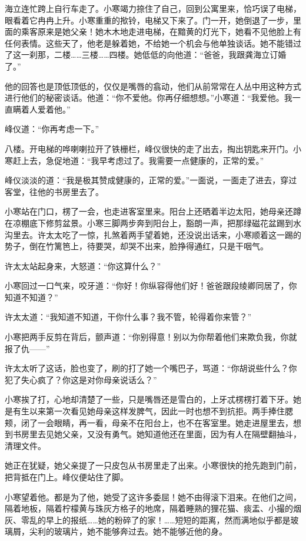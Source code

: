 \par 海立连忙跨上自行车走了。小寒竭力捺住了自己，回到公寓里来，恰巧误了电梯，眼看着它冉冉上升。小寒重重的揿铃，电梯又下来了。门一开，她倒退了一步，里面的乘客原来是她父亲！她木木地走进电梯，在黯黄的灯光下，她看不见他脸上有任何表情。这些天了，他老是躲着她，不给她一个机会与他单独谈话。她不能错过了这一刹那，二楼……三楼……四楼。她低低的向他道：“爸爸，我跟龚海立订婚了。”
\par 他的回答也是顶低顶低的，仅仅是嘴唇的翕动，他们从前常常在人丛中用这种方式进行他们的秘密谈话。他道：“你不爱他。你再仔细想想。”小寒道：“我爱他。我一直瞒着人爱着他。”
\par 峰仪道：“你再考虑一下。”
\par 八楼。开电梯的哗喇喇拉开了铁栅栏，峰仪很快的走了出去，掏出钥匙来开门。小寒赶上去，急促地道：“我早考虑过了。我需要一点健康的，正常的爱。”
\par 峰仪淡淡的道：“我是极其赞成健康的，正常的爱。”一面说，一面走了进去，穿过客堂，往他的书房里去了。
\par 小寒站在门口，楞了一会，也走进客室里来。阳台上还晒着半边太阳，她母亲还蹲在凉棚底下修剪盆景。小寒三脚两步奔到阳台上，豁朗一声，把那绿磁花盆踢到水沟里去。许太太吃了一惊，扎煞着两手望着她，还没说出话来，小寒顺着这一踢的势子，倒在竹篱笆上，待要哭，却哭不出来，脸挣得通红，只是干咽气。
\par 许太太站起身来，大怒道：“你这算什么？”
\par 小寒回过一口气来，咬牙道：“你好！你纵容得他们好！爸爸跟段绫卿同居了，你知道不知道？”
\par 许太太道：“我知道不知道，干你什么事？我不管，轮得着你来管？”
\par 小寒把两手反剪在背后，颤声道：“你别得意！别以为你帮着他们来欺负我，你就报了仇——”
\par 许太太听了这话，脸也变了，刷的打了她一个嘴巴子，骂道：“你胡说些什么？你犯了失心疯了？你这是对你母亲说话么？”
\par 小寒挨了打，心地却清楚了一些，只是嘴唇还是雪白的，上牙忒楞楞打着下牙。她是有生以来第一次看见她母亲这样发脾气，因此一时也想不到抗拒。两手捧住腮颊，闭了一会眼睛，再一看，母亲不在阳台上，也不在客室里。她走进屋里去，想到书房里去见她父亲，又没有勇气。她知道他还在里面，因为有人在隔壁翻抽斗，清理文件。
\par 她正在犹疑，她父亲提了一只皮包从书房里走了出来。小寒很快的抢先跑到门前，把背抵在门上。峰仪便站住了脚。
\par 小寒望着他。都是为了他，她受了这许多委屈！她不由得滚下泪来。在他们之间，隔着地板，隔着柠檬黄与珠灰方格子的地席，隔着睡熟的狸花猫、痰盂、小撮的烟灰、零乱的早上的报纸……她的粉碎了的家！……短短的距离，然而满地似乎都是玻璃屑，尖利的玻璃片，她不能够奔过去。她不能够近他的身。
